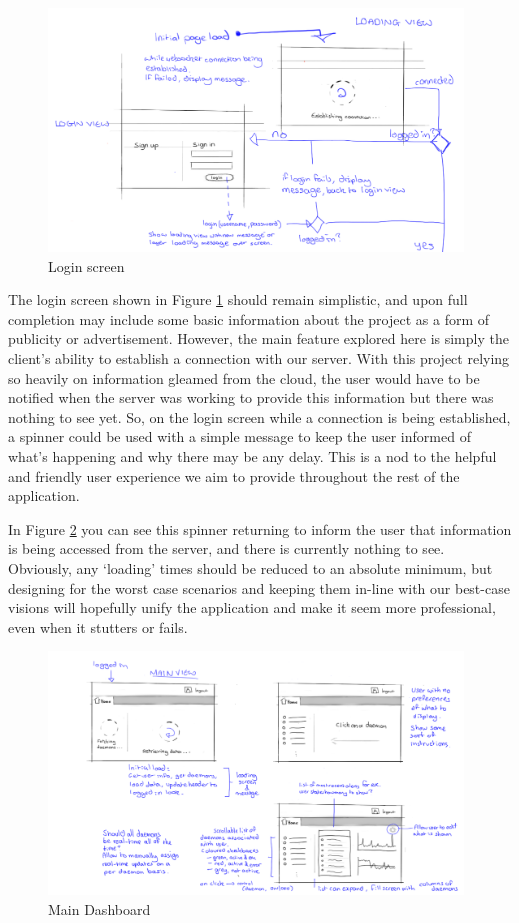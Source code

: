 \documentclass{l3proj}
\begin{document}
\begin{figure}[H]
\centering
\includegraphics[width=110mm]{Concept_Designs/Login.png}
\caption{Login screen}
\label{fig:Login}
\end{figure}

The login screen shown in Figure \ref{fig:Login} should remain simplistic, and upon full completion may include some basic information about the project as a form of publicity or advertisement. However, the main feature explored here is simply the client's ability to establish a connection with our server.  With this project relying so heavily on information gleamed from the cloud, the user would have to be notified when the server was working to provide this information but there was nothing to see yet. So, on the login screen while a connection is being established, a spinner could be used with a simple message to keep the user informed of what's happening and why there may be any delay. This is a nod to the helpful and friendly user experience we aim to provide throughout the rest of the application.

In Figure \ref{fig:MainDash} you can see this spinner returning to inform the user that information is being accessed from the server, and there is currently nothing to see.  Obviously, any `loading' times should be reduced to an absolute minimum, but designing for the worst case scenarios and keeping them in-line with our best-case visions will hopefully unify the application and make it seem more professional, even when it stutters or fails.

\begin{figure}[H]
\centering
\includegraphics[width=110mm]{Concept_Designs/MainView.png}
\caption{Main Dashboard}
\label{fig:MainDash}
\end{figure}
\end{document}
